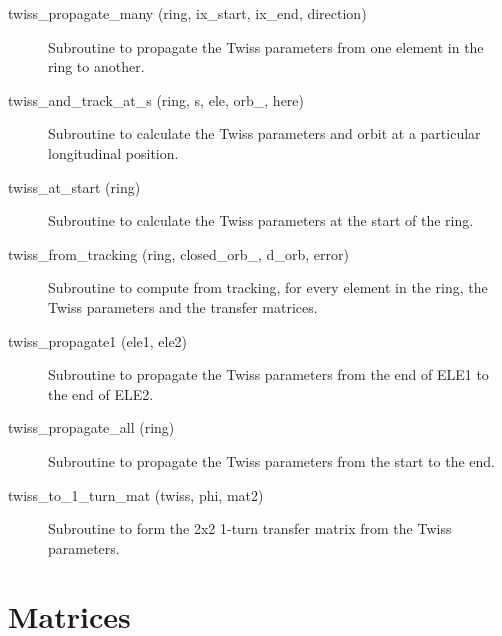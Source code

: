 \begin{description}
\item[twiss\_propagate\_many (ring, ix\_start, ix\_end, direction)] \Newline
Subroutine to propagate the Twiss parameters from one element in the ring to another. 

\item[twiss\_and\_track\_at\_s (ring, s, ele, orb\_, here)] \Newline
Subroutine to calculate the Twiss parameters and orbit at a particular longitudinal position. 

\item[twiss\_at\_start (ring)] \Newline
Subroutine to calculate the Twiss parameters at the start of the ring. 

\item[twiss\_from\_tracking (ring, closed\_orb\_, d\_orb, error)] \Newline
Subroutine to compute from tracking, for every element in the ring, 
the Twiss parameters and the transfer matrices. 

\item[twiss\_propagate1 (ele1, ele2)] \Newline
Subroutine to propagate the Twiss parameters from the end of ELE1 to the end of ELE2. 

\item[twiss\_propagate\_all (ring)] \Newline
Subroutine to propagate the Twiss parameters from the start to the end. 

\item[twiss\_to\_1\_turn\_mat (twiss, phi, mat2)] \Newline
Subroutine to form the 2x2 1-turn transfer matrix from the Twiss parameters. 

\end{description}

\section{Matrices}
\label{r:mat}

